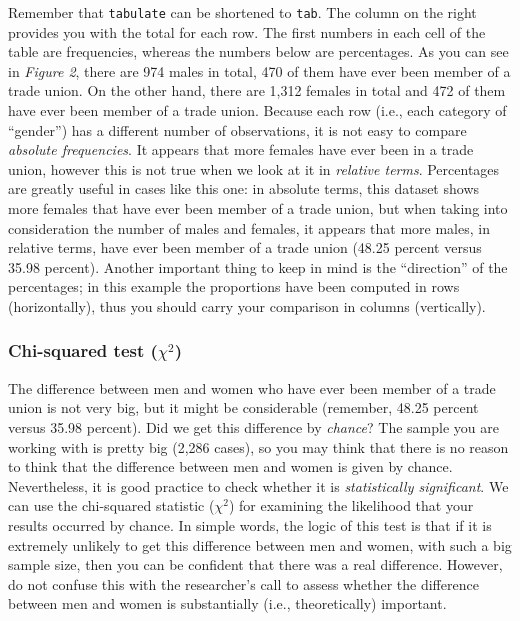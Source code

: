 \documentclass{article}
\begin{document}
Remember that \texttt{tabulate} can be shortened to \texttt{tab}. The column on the right provides you with the total for each row. The first numbers in each cell of the table are frequencies, whereas the numbers below are percentages. As you can see in \textit{Figure 2}, there are 974 males in total, 470 of them have ever been member of a trade union. On the other hand, there are 1,312 females in total and 472 of them have ever been member of a trade union. Because each row (i.e., each category of ``gender'') has a different number of observations, it is not easy to compare \textit{absolute frequencies}. It appears that more females have ever been in a trade union, however this is not true when we look at it in \textit{relative terms}. Percentages are greatly useful in cases like this one: in absolute terms, this dataset shows more females that have ever been member of a trade union, but when taking into consideration the number of males and females, it appears that more males, in relative terms, have ever been member of a trade union (48.25 percent versus 35.98 percent). Another important thing to keep in mind is the ``direction'' of the percentages; in this example the proportions have been computed in rows (horizontally), thus you should carry your comparison in columns (vertically).

\subsubsection*{Chi-squared test ($\chi^2$)}

The difference between men and women who have ever been member of a trade union is not very big, but it might be considerable (remember, 48.25 percent versus 35.98 percent). Did we get this difference by \textit{chance}? The sample you are working with is pretty big (2,286 cases), so you may think that there is no reason to think that the difference between men and women is given by chance. Nevertheless, it is good practice to check whether it is \textit{statistically significant}. We can use the chi-squared statistic ($\chi^2$) for examining the likelihood that your results occurred by chance. In simple words, the logic of this test is that if it is extremely unlikely to get this difference between men and women, with such a big sample size, then you can be confident that there was a real difference. However, do not confuse this with the researcher's call to assess whether the difference between men and women is substantially (i.e., theoretically) important.
\end{document}
